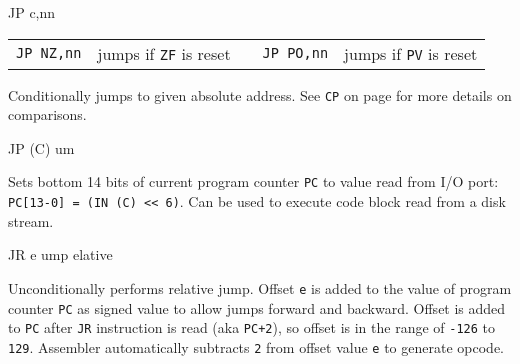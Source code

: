 \begin{basedescript}{
    \desclabelstyle{\multilinelabel}
    \desclabelwidth{3cm}}
\begin{DetailItem}{JP c,nn}
\begin{tabular}{@{}llcll}
            {\tt JP NZ,nn} & jumps if {\tt ZF} is reset & &
                {\tt JP PO,nn} & jumps if {\tt PV} is reset\\
        \end{tabular}

        Conditionally jumps to given absolute address. See {\tt CP} on page \pageref{DetailRefCP} for more details on comparisons.

        \begin{DetailEffects}
            \FlagsJPccnn
        \end{DetailEffects}
				
        \begin{DetailTiming}
        \end{DetailTiming}

    \end{DetailItem}

    \begin{DetailItem}{JP (C)\ZXN}
        {um}
        {\SymJPC}

        Sets bottom 14 bits of current program counter {\tt PC}\See{*} to value read from I/O port: {\tt PC[13-0] = (IN (C) << 6)}. Can be used to execute code block read from a disk stream.
		

        \begin{DetailEffects}
            \FlagsJPc
        \end{DetailEffects}
				
        \begin{DetailTiming}
        \end{DetailTiming}

    \end{DetailItem}

    \begin{DetailItem}{JR e}
        {ump elative}
        {}
		
        Unconditionally performs relative jump. Offset {\tt e} is added to the value of program counter {\tt PC} as signed value to allow jumps forward and backward. Offset is added to {\tt PC} after {\tt JR} instruction is read (aka {\tt PC+2}), so offset is in the range of {\tt -126} to {\tt 129}. Assembler automatically subtracts {\tt 2} from offset value {\tt e} to generate opcode.


\end{DetailItem}
\end{basedescript}
